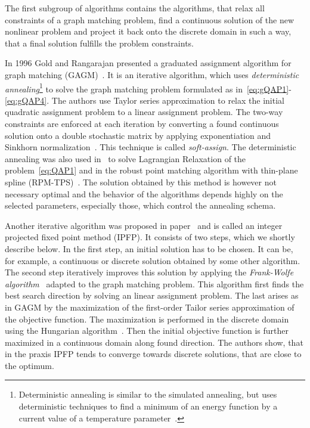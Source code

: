 The first subgroup of algorithms contains the algorithms, that relax all constraints of a graph matching problem, find a continuous solution of the new nonlinear problem and project it back onto the discrete domain in such a way, that a final solution fulfills the problem constraints. 

In 1996 Gold and Rangarajan presented a graduated assignment algorithm for graph matching (GAGM)~\cite{Rangarajan1996_GAGM}. It is an iterative algorithm, which uses \emph{deterministic annealing}\footnote{Deterministic annealing is similar to the simulated annealing, but uses deterministic techniques to find a minimum of an energy function by a current value of a temperature parameter~\cite{Rose1991_DA}.} to solve the graph matching problem formulated as in~\eqref{eq:gQAP1}-\eqref{eq:gQAP4}. The authors use Taylor series approximation to relax the initial quadratic assignment problem to a linear assignment problem. The two-way constraints are enforced at each iteration by converting a  found continuous solution onto a double stochastic matrix by applying exponentiation and Sinkhorn normalization~\cite{Sinkhorn1964}. This technique is called \emph{soft-assign}. The deterministic annealing was also used in~\cite{Rangarajan96_LagRelax} to solve Lagrangian Relaxation of the problem~\eqref{eq:QAP1} and in the robust point matching algorithm with thin-plane spline (RPM-TPS)~\cite{Chui2003}. The solution obtained by this method is however not necessary optimal and the behavior of the algorithms depends highly on the selected parameters, especially those, which control the annealing schema.

Another iterative algorithm was proposed in paper~\cite{Leordeanu2009_IPFP} and is called an integer projected fixed point method (IPFP). It consists of two steps, which we shortly describe below. In the first step, an initial solution has to be chosen. It can be, for example, a continuous or discrete solution obtained by some other algorithm. The second step iteratively improves this solution by applying the \emph{Frank-Wolfe algorithm}~\cite{Wolfe1956} adapted to the graph matching problem. This algorithm first finds the best search direction by solving an linear assignment problem. The last arises as in GAGM by the maximization of the first-order Tailor series approximation of the objective function. The maximization is performed in the discrete domain using the Hungarian algorithm~\cite{Kuhn1955}. Then the initial objective function is further maximized in a continuous domain along found direction. The authors show, that in the praxis IPFP tends to converge towards discrete solutions, that are close to the optimum.

